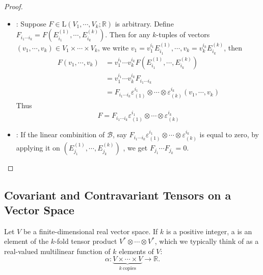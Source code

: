\documentclass[../main.tex]{subfiles}
\begin{document}
\begin{proof}
    \begin{itemize}
        \item {}: Suppose \(  F\in \mathrm{L}\left(  V_1,\cdots,V_k ;\mathbb{R}  \right)   \) is arbitrary. Define \(  F_{i_1\cdots i_{k}}= F\left( E_{i_1}^{\left( 1 \right) },\cdots ,E_{i_{k}}^{\left( k \right) } \right)   \).  Then for any \(  k  \)-tuples of vectors \(  \left(  v_1,\cdots,v_k  \right)\in V_1\times \cdots \times V_{k}   \), we write \(  v_{1}= v_{1}^{i_1}E_{i_1}^{\left( 1 \right) },\cdots , v_{k}= v_{k}^{i_{k}}E_{i_{k}}^{\left( k \right) }  \), then \[
   \begin{aligned}
    F\left( v_1,\cdots ,v_{k} \right)&= v_1^{i_1}\cdots v_{k}^{i_{k}}F\left( E_{i_1}^{\left( 1 \right) },\cdots ,E_{i_{k}}^{\left( k \right) } \right)\\ 
     &= v_1^{i_1}\cdots v_{k}^{i_{k}}F_{i_1\cdots i_{k}}  \\ 
      &= F_{i_1\cdots i_{k}} \varepsilon _{\left( 1 \right) }^{i_1}\otimes \cdots \otimes  \varepsilon _{\left( k \right) }^{i_{k}}\left( v_1,\cdots ,v_{k} \right) 
   \end{aligned} 
    \]Thus \[
    F= F_{i_1\cdots i_{k}} \varepsilon ^{i_1}_{\left( 1 \right) }\otimes \cdots \otimes  \varepsilon ^{i_{k}}_{\left( k \right) }
    \]  
    \item {}:   If the linear combinition of \(  \mathcal{B}  \), say \(  F_{i_1\cdots i_{k}} \varepsilon ^{i_1}_{\left( 1 \right) }\otimes \cdots \otimes  \varepsilon ^{i_{k}}_{\left( k \right) }  \) is equal to zero, by applying it on \(  \left( E_{j_1}^{\left( 1 \right) },\cdots , E_{j_{k}}^{\left( k \right) }  \right) \)    , we get \(  F_{j_1}\cdots F_{j_{k}}= 0  \). 
    \end{itemize}
    
\end{proof}

\subsection*{Covariant and Contravariant Tensors on a Vector Space}

\begin{definition}{}{}
    Let \(V\) be a finite-dimensional real vector space. If \(k\) is a positive integer, a  is an element of the \(k\)-fold tensor product \(V^{*} \otimes \cdots \otimes V^{*}\), which we typically think of as a real-valued multilinear function of \(k\) elements of \(V\):
\[
\alpha : \underbrace{V \times \cdots \times V}_{k\ \text{copies}} \to \mathbb{R}.
\]
\end{definition}
\end{document}
